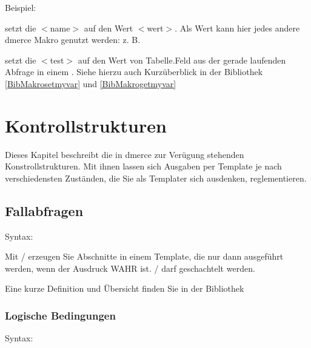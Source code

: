 \bigskip

Beispiel:


setzt die  $<$name$>$ auf den Wert $<$wert$>$. Als
Wert kann hier jedes andere dmerce Makro genutzt werden: z. B.


setzt die  $<$test$>$ auf den Wert von Tabelle.Feld
aus der gerade laufenden Abfrage in einem 
. Siehe hierzu auch Kurz\"uberblick in der Bibliothek
\vref{BibMakrosetmyvar} und \vref{BibMakrogetmyvar}

\chapter{Kontrollstrukturen}

Dieses Kapitel beschreibt die in dmerce zur Ver\"ugung stehenden
Konstrollstrukturen.  Mit ihnen lassen sich Ausgaben per Template je
nach verschiedensten Zust\"anden, die Sie als Templater sich
ausdenken, reglementieren.

\newpage
\section{Fallabfragen}
\label{Fallabfragen}

Syntax: 

Mit  /  erzeugen Sie Abschnitte in
einem Template, die nur dann ausgef\"uhrt werden, wenn der Ausdruck
WAHR ist.  /  darf geschachtelt
werden.

Eine kurze Definition und \"Ubersicht finden Sie in der Bibliothek

\subsection{Logische Bedingungen}

Syntax: 

\medskip

